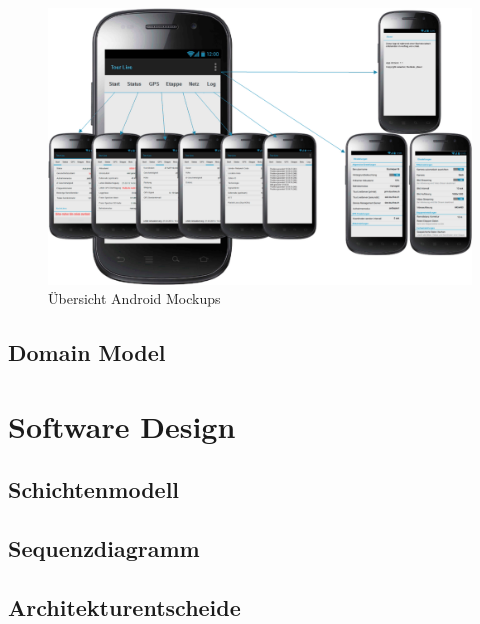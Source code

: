 \begin{figure}[H]
	\centering
	\includegraphics[width=150mm]{images/OverviewAndroid.png}
	\caption{Übersicht Android Mockups}
\end{figure}

\subsection{Domain Model}


\section{Software Design}
\subsection{Schichtenmodell}


\subsection{Sequenzdiagramm}

\subsection{Architekturentscheide}
